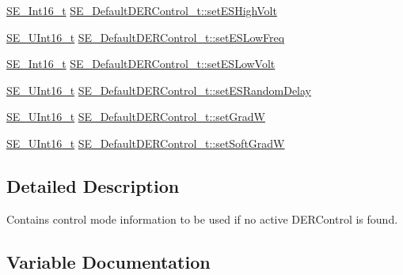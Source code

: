 \begin{DoxyCompactItemize}
\item 
\hyperlink{group__Int16_ga0d600c7df811a7d4b4816e8965877690}{S\+E\+\_\+\+Int16\+\_\+t} \hyperlink{group__DefaultDERControl_ga818efdf68d11fc69e009abc026a0f981}{S\+E\+\_\+\+Default\+D\+E\+R\+Control\+\_\+t\+::set\+E\+S\+High\+Volt}
\item 
\hyperlink{group__UInt16_gac68d541f189538bfd30cfaa712d20d29}{S\+E\+\_\+\+U\+Int16\+\_\+t} \hyperlink{group__DefaultDERControl_ga27fcac98cfffed69acb39dbefffaac4b}{S\+E\+\_\+\+Default\+D\+E\+R\+Control\+\_\+t\+::set\+E\+S\+Low\+Freq}
\item 
\hyperlink{group__Int16_ga0d600c7df811a7d4b4816e8965877690}{S\+E\+\_\+\+Int16\+\_\+t} \hyperlink{group__DefaultDERControl_ga105454967aecd8e505c6456389d63e3e}{S\+E\+\_\+\+Default\+D\+E\+R\+Control\+\_\+t\+::set\+E\+S\+Low\+Volt}
\item 
\hyperlink{group__UInt16_gac68d541f189538bfd30cfaa712d20d29}{S\+E\+\_\+\+U\+Int16\+\_\+t} \hyperlink{group__DefaultDERControl_gad9d93853acbfe271a02fe438eff09313}{S\+E\+\_\+\+Default\+D\+E\+R\+Control\+\_\+t\+::set\+E\+S\+Random\+Delay}
\item 
\hyperlink{group__UInt16_gac68d541f189538bfd30cfaa712d20d29}{S\+E\+\_\+\+U\+Int16\+\_\+t} \hyperlink{group__DefaultDERControl_ga89a34e3b5eeda3880b30f0c4136257ad}{S\+E\+\_\+\+Default\+D\+E\+R\+Control\+\_\+t\+::set\+GradW}
\item 
\hyperlink{group__UInt16_gac68d541f189538bfd30cfaa712d20d29}{S\+E\+\_\+\+U\+Int16\+\_\+t} \hyperlink{group__DefaultDERControl_gae2bf2188e38848f18c748c1b540d3429}{S\+E\+\_\+\+Default\+D\+E\+R\+Control\+\_\+t\+::set\+Soft\+GradW}
\end{DoxyCompactItemize}


\subsection{Detailed Description}
Contains control mode information to be used if no active D\+E\+R\+Control is found. 

\subsection{Variable Documentation}
\mbox{\label{group__DefaultDERControl_ga08511ed7222a49228f0f66ca52404d0a}} 
